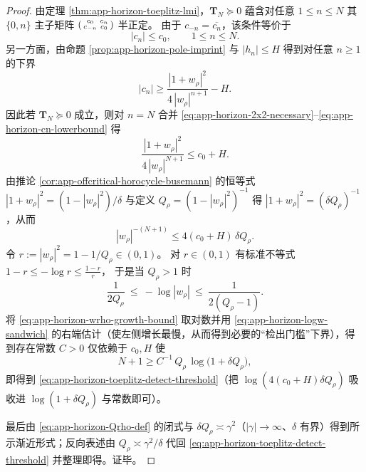 \begin{proof}
由定理 \ref{thm:app-horizon-toeplitz-lmi}，\(\mathbf{T}_N\succeq 0\) 蕴含对任意 \(1\le n\le N\) 其 \(\{0,n\}\) 主子矩阵
\(
\begin{psmallmatrix}
c_0 & c_n\\
c_{-n} & c_0
\end{psmallmatrix}
\)
半正定。
由于 \(c_{-n}=\overline{c_n}\)，该条件等价于
\begin{equation}\label{eq:app-horizon-2x2-necessary}
|c_n|\le c_0,\qquad 1\le n\le N.
\end{equation}
另一方面，由命题 \ref{prop:app-horizon-pole-imprint} 与 \(|h_n|\le H\) 得到对任意 \(n\ge 1\) 的下界
\begin{equation}\label{eq:app-horizon-cn-lowerbound}
|c_n|
\ge
\frac{|1+w_\rho|^2}{4\,|w_\rho|^{n+1}}-H.
\end{equation}
因此若 \(\mathbf{T}_N\succeq 0\) 成立，则对 \(n=N\) 合并 \eqref{eq:app-horizon-2x2-necessary}--\eqref{eq:app-horizon-cn-lowerbound} 得
\[
\frac{|1+w_\rho|^2}{4\,|w_\rho|^{N+1}}\le c_0+H.
\]
由推论 \ref{cor:app-offcritical-horocycle-busemann} 的恒等式
\(
|1+w_\rho|^2=(1-|w_\rho|^2)/\delta
\)
与定义 \(Q_\rho=(1-|w_\rho|^2)^{-1}\) 得 \(|1+w_\rho|^2=(\delta Q_\rho)^{-1}\)，从而
\begin{equation}\label{eq:app-horizon-wrho-growth-bound}
|w_\rho|^{-(N+1)}\le 4(c_0+H)\,\delta Q_\rho.
\end{equation}
令 \(r:=|w_\rho|^2=1-1/Q_\rho\in(0,1)\)。
对 \(r\in(0,1)\) 有标准不等式
\(
1-r\le -\log r \le \frac{1-r}{r}
\)，
于是当 \(Q_\rho>1\) 时
\begin{equation}\label{eq:app-horizon-logw-sandwich}
\frac{1}{2Q_\rho}\ \le\ -\log|w_\rho|\ \le\ \frac{1}{2(Q_\rho-1)}.
\end{equation}
将 \eqref{eq:app-horizon-wrho-growth-bound} 取对数并用 \eqref{eq:app-horizon-logw-sandwich} 的右端估计（使左侧增长最慢，从而得到必要的“检出门槛”下界），得到存在常数 \(C>0\) 仅依赖于 \(c_0,H\) 使
\[
N+1
\ge
C^{-1}\,Q_\rho\,\log\!\bigl(1+\delta Q_\rho\bigr),
\]
即得到 \eqref{eq:app-horizon-toeplitz-detect-threshold}（把 \(\log(4(c_0+H)\delta Q_\rho)\) 吸收进 \(\log(1+\delta Q_\rho)\) 与常数即可）。
\par
最后由 \eqref{eq:app-horizon-Qrho-def} 的闭式与 \(\delta Q_\rho\asymp \gamma^2\)（\(|\gamma|\to\infty\)、\(\delta\) 有界）得到所示渐近形式；反向表述由 \(Q_\rho\asymp \gamma^2/\delta\) 代回 \eqref{eq:app-horizon-toeplitz-detect-threshold} 并整理即得。证毕。
\end{proof}

